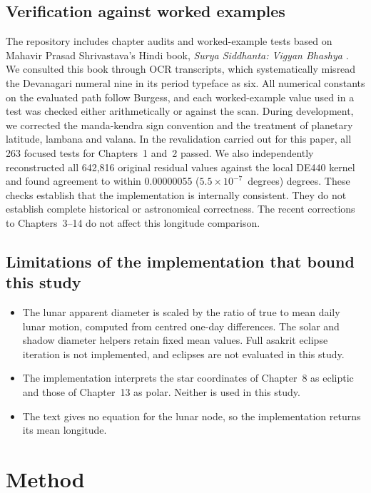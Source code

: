 \documentclass[11pt,a4paper]{article}
\begin{document}
\subsection{Verification against worked examples}

The repository includes chapter audits and worked-example tests based on Mahavir Prasad Shrivastava's Hindi book, \textit{Surya Siddhanta: Vigyan Bhashya} \citep{shrivastava}. We consulted this book through OCR transcripts, which systematically misread the Devanagari numeral nine in its period typeface as six. All numerical constants on the evaluated path follow Burgess, and each worked-example value used in a test was checked either arithmetically or against the scan. During development, we corrected the manda-kendra sign convention and the treatment of planetary latitude, lambana and valana. In the revalidation carried out for this paper, all 263 focused tests for Chapters~1 and~2 passed. We also independently reconstructed all 642,816 original residual values against the local DE440 kernel and found agreement to within 0.00000055 ($5.5\times10^{-7}$~degrees) degrees. These checks establish that the implementation is internally consistent. They do not establish complete historical or astronomical correctness. The recent corrections to Chapters~3--14 do not affect this longitude comparison.

\subsection{Limitations of the implementation that bound this study}

\begin{itemize}
  \item The lunar apparent diameter is scaled by the ratio of true to mean daily lunar motion, computed from centred one-day differences. The solar and shadow diameter helpers retain fixed mean values. Full asakrit eclipse iteration is not implemented, and eclipses are not evaluated in this study.
  \item The implementation interprets the star coordinates of Chapter~8 as ecliptic and those of Chapter~13 as polar. Neither is used in this study.
  \item The text gives no equation for the lunar node, so the implementation returns its mean longitude.
\end{itemize}

\section{Method}
\label{sec:method}
\end{document}
